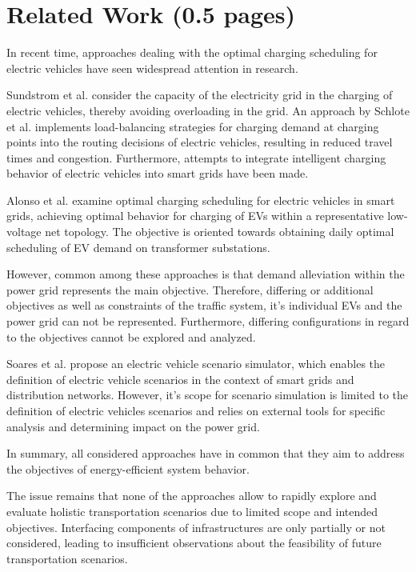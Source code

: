 \section{Related Work (0.5 pages)}

In recent time, approaches dealing with the optimal charging scheduling for electric vehicles have seen widespread attention in research. 

Sundstrom et al. \cite{sundstrom2010planning} consider the capacity of the electricity grid in the charging of electric vehicles, thereby avoiding overloading in the grid.
An approach by Schlote et al. \cite{schlote2012balanced} implements load-balancing strategies for charging demand at charging points into the routing decisions of electric vehicles, resulting in reduced travel times and congestion. 
Furthermore, attempts to integrate intelligent charging behavior of electric vehicles into smart grids have been made. 

Alonso et al. \cite{alonso2014optimal} examine optimal charging scheduling for electric vehicles in smart grids, achieving optimal behavior for charging of EVs within a representative low-voltage net topology. The objective is oriented towards obtaining daily optimal scheduling of EV demand on transformer substations.

However, common among these approaches is that demand alleviation within the power grid represents the main objective. Therefore, differing or additional objectives as well as constraints of the traffic system, it's individual EVs and the power grid can not be represented. Furthermore, differing configurations in regard to the objectives cannot be explored and analyzed. 

Soares et al. \cite{soares2012electric} propose an electric vehicle scenario simulator, which enables the definition of electric vehicle scenarios in the context of smart grids and distribution networks.
However, it's scope for scenario simulation is limited to the definition of electric vehicles scenarios and relies on external tools for specific analysis and determining impact on the power grid.

In summary, all considered approaches have in common that they aim to address the objectives of energy-efficient system behavior.

The issue remains that none of the approaches allow to rapidly explore and evaluate holistic transportation scenarios due to limited scope and intended objectives. Interfacing components of infrastructures are only partially or not considered, leading to insufficient observations about the feasibility of future transportation scenarios.